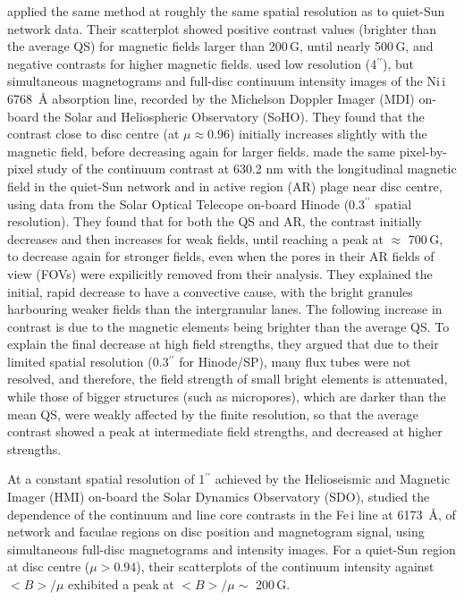 \documentclass[goettingen, gauss, print]{thesis}
\begin{document}
\cite{lawrence_contrast_1993} applied the same method at roughly the same spatial resolution as \cite{topka_properties_1992} to quiet-Sun network data. Their scatterplot showed positive contrast values (brighter than the average QS) for magnetic fields larger than 200\,G, until nearly 500\,G, and negative contrasts for higher magnetic fields.
\cite{ortiz_intensity_2002} used low resolution (4$^{\prime\prime}$), but simultaneous magnetograms and full-disc continuum intensity images of the Ni\,{\sc i} 6768\, \AA{} absorption line, recorded by the Michelson Doppler Imager (MDI) on-board the Solar and Heliospheric Observatory (SoHO). They found that the contrast close to disc centre (at $\mu \approx 0.96$) initially increases slightly with the magnetic field, before decreasing again for larger fields.
\cite{kobel_continuum_2011} made the same pixel-by-pixel study of the continuum contrast at 630.2 nm with the longitudinal magnetic field in the quiet-Sun network and in active region (AR) plage near disc centre, using data from the Solar Optical Telecope on-board Hinode (0.3$^{\prime\prime}$ spatial resolution). They found that for both the QS and AR, the contrast initially decreases and then increases for weak fields, until reaching a peak at $\approx$ 700\,G, to decrease again for stronger fields, even when the pores in their AR fields of view (FOVs) were expilicitly removed from their analysis. They explained the initial, rapid decrease to have a convective cause, with the bright granules harbouring weaker fields than the intergranular lanes. The following increase in contrast is due to the magnetic elements being brighter than the average QS. To explain the final decrease at high field strengths, they argued that due to their limited spatial resolution (0.3$^{\prime\prime}$ for Hinode/SP), many flux tubes were not resolved, and therefore, the field strength of small bright elements is attenuated, while those of bigger structures (such as micropores), which are darker than the mean QS, were weakly affected by the finite resolution, so that the average contrast showed a peak at intermediate field strengths, and decreased at higher strengths.

At a constant spatial resolution of 1$^{\prime\prime}$ achieved by the Helioseismic and Magnetic Imager (HMI) on-board the Solar Dynamics Observatory (SDO), \cite{yeo_intensity_2013} studied the dependence of the continuum and line core contrasts in  the Fe\,{\sc i} line at 6173\, \AA{}, of network and faculae regions on disc position and magnetogram signal, using simultaneous full-disc magnetograms and intensity images. For a quiet-Sun region at disc centre ($\mu > 0.94$), their scatterplots of the continuum intensity against $<B>/\mu$ exhibited a peak at $<B>/\mu \sim$ 200\,G.  
\end{document}
